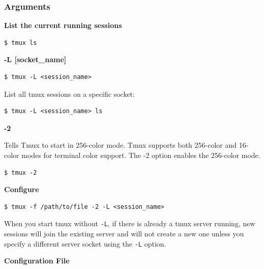 \documentclass{article}
\newenvironment{blocktemplateIII}[1]{%
    \tcolorbox[beamer,%
    noparskip,breakable,
    ,colframe=Red,%
    colbacklower=LimeGreen!75!LightGreen,%
    title=#1]}%
    {\endtcolorbox}
\newenvironment{codetemplate}[1][]{%
  \mybasecolorbox[#1]
  \itshape
}{%
  \endmybasecolorbox
}
\begin{document}
    

\subsubsection{Arguments}

\textbf{List the current running sessions}
\begin{codetemplate}
\begin{verbatim}
$ tmux ls
\end{verbatim}
\end{codetemplate}

\textbf{-L [socket\_name]}

\begin{codetemplate}
\begin{verbatim}
$ tmux -L <session_name>
\end{verbatim}
\end{codetemplate}

List all tmux sessions on a specific socket:
\begin{codetemplate}
\begin{verbatim}
$ tmux -L <session_name> ls
\end{verbatim}
\end{codetemplate}

\textbf{-2}

Tells Tmux to start in 256-color mode. Tmux supports both 256-color and 16-color modes for terminal color support. The -2 option enables the 256-color mode.

\begin{codetemplate}
\begin{verbatim}
$ tmux -2
\end{verbatim}
\end{codetemplate}

\textbf{Configure}
\begin{codetemplate}
\begin{verbatim}
$ tmux -f /path/to/file -2 -L <session_name>
\end{verbatim}
\end{codetemplate}

\begin{blocktemplateIII}{Warning}
When you start tmux without \verb|-L|, if there is already a tmux server running, new sessions will join the existing server and will not create a new one unless you specify a different server socket using the \verb|-L| option.
\end{blocktemplateIII}

\textbf{Configuration File}
\end{document}
